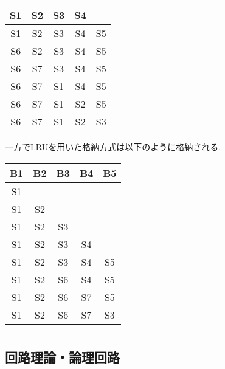 \documentclass[dvipdfmx,titlepage, 11pt, a4paper]{jsarticle}%
\begin{document}
\begin{enumerate}[(1)]
\begin{center}
\begin{tabular}{|c|c|c|c|c|}
      S1&S2&S3&S4& \\ \hline
      S1&S2&S3&S4&S5 \\ \hline
      S6&S2&S3&S4&S5 \\ \hline
      S6&S7&S3&S4&S5 \\ \hline
      S6&S7&S1&S4&S5 \\ \hline
      S6&S7&S1&S2&S5 \\ \hline
      S6&S7&S1&S2&S3 \\ \hline
    \end{tabular}
  \end{center}
  一方でLRUを用いた格納方式は以下のように格納される.
  \begin{center}
    \begin{tabular}{|c|c|c|c|c|} \hline
      B1&B2&B3&B4&B5\\ \hline\hline
      S1&&&& \\ \hline
      S1&S2&&& \\ \hline
      S1&S2&S3&& \\ \hline
      S1&S2&S3&S4& \\ \hline
      S1&S2&S3&S4&S5 \\ \hline
      S1&S2&S6&S4&S5 \\ \hline
      S1&S2&S6&S7&S5 \\ \hline
      S1&S2&S6&S7&S3 \\ \hline
    \end{tabular}
  \end{center}
\end{enumerate}
\newpage
\section{}
\subsection{回路理論・論理回路}
\end{document}
